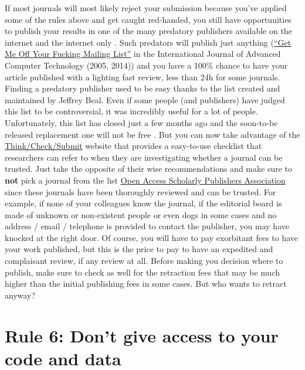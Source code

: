 \documentclass[a4paper,10pt,onecolumn]{article}
\begin{document}
If most journals will most likely reject your submission because you've applied
some of the rules above and get caught red-handed, you still have opportunities
to publish your results in one of the many predatory publishers available on
the internet and the internet only \citep{shen:2015}. Such predators will
publish just anything
(\href{https://en.wikipedia.org/wiki/International_Journal_of_Advanced_Computer_Technology#Publication_controversy}{``Get
  Me Off Your Fucking Mailing List''} in the International Journal of Advanced
Computer Technology (2005, 2014)) and you have a 100\% chance to have your
article published with a lighting fast review, less than 24h for some
journals. Finding a predatory publisher used to be easy thanks to the list
created and maintained by Jeffrey Beal. Even if some people (and publishers)
have judged this list to be controversial, it was incredibly useful for a lot
of people. Unfortunately, this list has closed just a few months ago
\citep{straumsheim:2017} and the
soon-to-be released replacement one will not be free \citep{silver:2017}. But
you can now take advantage of the
\href{http://thinkchecksubmit.org}{Think/Check/Submit} website that provides a
easy-to-use checklist that researchers can refer to when they are investigating
whether a journal can be trusted. Just take the opposite of their wise
recommendations and make sure to \textbf{not} pick a journal from the list
\href{https://oaspa.org}{Open Access Scholarly Publishers Association} since
these journals have been thoroughly reviewed and can be trusted. For example,
if none of your colleagues know the journal, if the editorial board is made of
unknown or non-existent people \citep{sorokowski:2017} or even dogs in some
cases \citep{kennedy:2017} and no address / email / telephone is provided to
contact the publisher, you may have knocked at the right door. Of course, you
will have to pay exorbitant fees to have your work published, but this is the
price to pay to have an expedited and complaisant review, if any review at
all. Before making you decision where to publish, make sure to check as well
for the retraction fees that may be much higher than the initial publishing
fees in some cases. But who wants to retract anyway?

\section*{Rule 6: Don't give access to your code and data}

\end{document}
